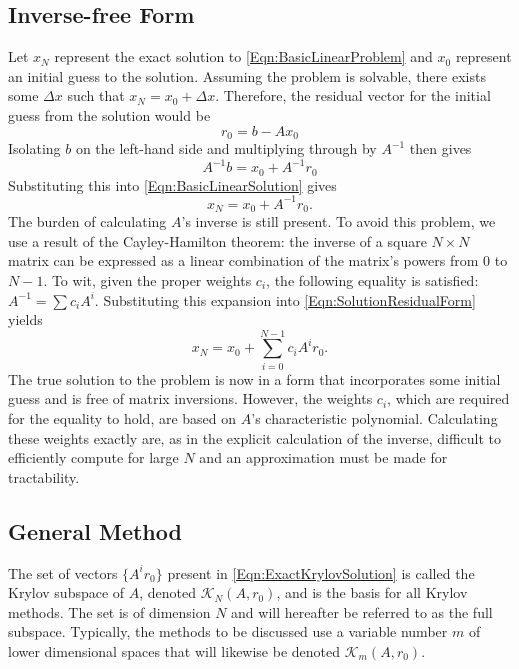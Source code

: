 \documentclass[Prelim,12pt]{WisconsinThesis}
\newcommand{\by}    {\!\times\!}
\begin{document}
\subsection{Inverse-free Form}
Let $x_N$ represent the exact solution to \cref{Eqn:BasicLinearProblem} and $x_0$ represent an initial guess to the solution.
Assuming the problem is solvable, there exists some $\Delta{x}$ such that $x_N = x_0 + \Delta{x}$.
Therefore, the residual vector for the initial guess from the solution would be
\begin{equation}
    r_0 = b - A x_0
    \label{Eqn:InitialResidual}
\end{equation}
Isolating $b$ on the left-hand side and multiplying through by $A^{-1}$ then gives
\begin{equation}
    A^{-1} b = x_0 + A^{-1} r_0
\end{equation}
Substituting this into \cref{Eqn:BasicLinearSolution} gives
\begin{equation}
    x_N = x_0 + A^{-1} r_0.
    \label{Eqn:SolutionResidualForm}
\end{equation}
The burden of calculating $A$'s inverse is still present.
To avoid this problem, we use a result of the Cayley-Hamilton theorem: the inverse of a square $N \by N$ matrix can be expressed as a linear combination of the matrix's powers from $0$ to $N-1$.
To wit, given the proper weights $c_i$, the following equality is satisfied: $A^{-1} = \sum c_i A^i$.
Substituting this expansion into \cref{Eqn:SolutionResidualForm} yields
\begin{equation}
    x_N = x_0 + \sum_{i = 0}^{N-1} c_i A^i r_0.
    \label{Eqn:ExactKrylovSolution}
\end{equation}
The true solution to the problem is now in a form that incorporates some initial guess and is free of matrix inversions.
However, the weights $c_i$, which are required for the equality to hold, are based on $A$'s characteristic polynomial.
Calculating these weights exactly are, as in the explicit calculation of the inverse, difficult to efficiently compute for large $N$ and an approximation must be made for tractability.


\subsection{General Method}

The set of vectors $\{A^i r_0\}$ present in \cref{Eqn:ExactKrylovSolution} is called the Krylov subspace of $A$, denoted $\mathcal{K}_N(A,r_0)$, and is the basis for all Krylov methods.
The set is of dimension $N$ and will hereafter be referred to as the full subspace.
Typically, the methods to be discussed use a variable number $m$ of lower dimensional spaces that will likewise be denoted $\mathcal{K}_m(A,r_0)$.
\end{document}
